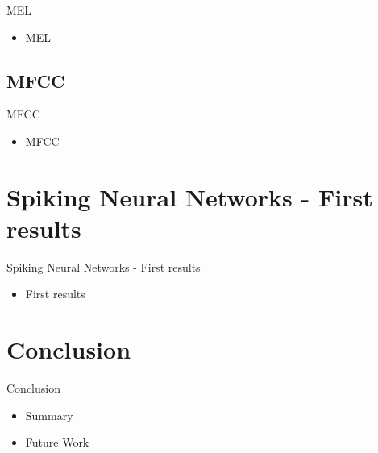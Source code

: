 \documentclass[aspectratio=169, 11pt]{beamer}
\begin{document}
\begin{frame}{MEL}
  \begin{itemize}
    \item MEL
  \end{itemize}
\end{frame}

\subsection{MFCC}

\begin{frame}{MFCC}
  \begin{itemize}
    \item MFCC
  \end{itemize}
\end{frame}

\section{Spiking Neural Networks - First results}

\begin{frame}{Spiking Neural Networks - First results}
  \begin{itemize}
    \item First results
  \end{itemize}
\end{frame}

\section{Conclusion}

\begin{frame}{Conclusion}
  \begin{itemize}
    \item Summary
    \item Future Work
  \end{itemize}
\end{frame}
\end{document}

